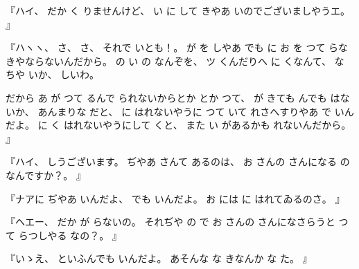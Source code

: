 %
『ハイ、
%
だか
く
りませんけど、
%
い
に
して
きやあ
いのでございましやうエ。
』

%
『ハヽヽ、
%
さ、
%
さ、
%
それで
いとも！。
%
が
を
しやあ
でも
に
お
を
つて
らなきやならないんだから。
%
の
い
の
なんぞを、
%
ツ
くんだりへ
に
くなんて、
%
な
ちや
いか、
%
しいわ。

%
だから
あ
が
つて
るんで
られないからとか
とか
つて、
%
が
きても
んでも
はないか、
%
あんまりな
だと、
%
に
はれないやうに
つて
いて
れさへすりやあ
で
いんだよ。
%
に
く
はれないやうにして
くと、
%
また
い
があるかも
れないんだから。
』

%
『ハイ、
%
しうございます。
%
ぢやあ
さんて
あるのは、
%
お
さんの
さんになる
の
なんですか？。
』

%
『ナアに
ぢやあ
いんだよ、
%
でも
いんだよ。
%
お
には
に
はれてゐるのさ。
』

%
『ヘエー、
%
だか
が
らないの。
%
それぢや
の
で
お
さんの
さんになさらうと
つて
らつしやる
なの？。
』

%
『いゝえ、
%
といふんでも
いんだよ。
%
あそんな
な
きなんか
な
た。
』


